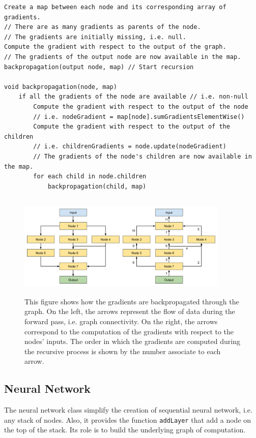 \documentclass[11pt]{report}
\begin{document}
\begin{verbatim}
Create a map between each node and its corresponding array of gradients.
// There are as many gradients as parents of the node.
// The gradients are initially missing, i.e. null.
Compute the gradient with respect to the output of the graph.
// The gradients of the output node are now available in the map.
backpropagation(output node, map) // Start recursion

void backpropagation(node, map)
    if all the gradients of the node are available // i.e. non-null
        Compute the gradient with respect to the output of the node
        // i.e. nodeGradient = map[node].sumGradientsElementWise()
        Compute the gradient with respect to the output of the children
        // i.e. childrenGradients = node.update(nodeGradient)
        // The gradients of the node's children are now available in the map.
        for each child in node.children
            backpropagation(child, map)
\end{verbatim}

\begin{figure}[h]
\centering
\includegraphics[width=10cm, height=5cm]{graph_bp}
\caption[Backpropagation of the gradients in a graph of computation]{This figure shows how the gradients are backpropagated through the graph. On the left, the arrows represent the flow of data during the forward pass, i.e. graph connectivity. On the right, the arrows correspond to the computation of the gradients with respect to the nodes' inputs. The order in which the gradients are computed during the recursive process is shown by the number associate to each arrow.}
\end{figure}

\subsection{Neural Network}

The neural network class simplify the creation of sequential neural network, i.e. any stack of nodes. Also, it provides the function \texttt{addLayer} that add a node on the top of the stack. Its role is to build the underlying graph of computation.
\end{document}
